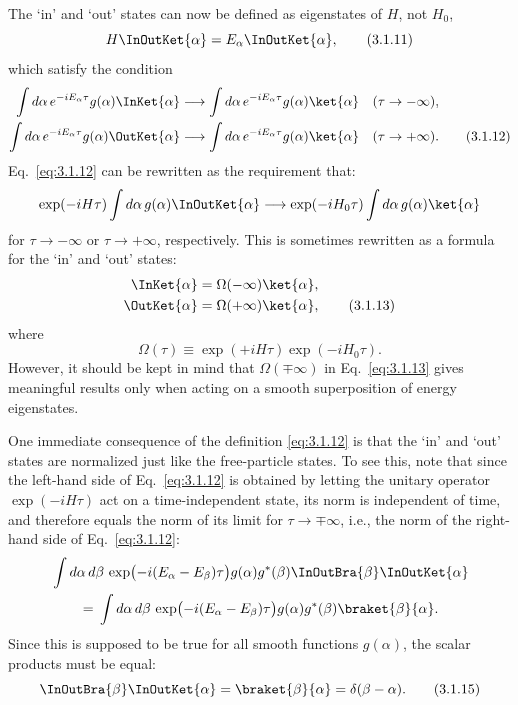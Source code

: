 The `in' and `out' states can now be defined as eigenstates of $H$, not $H_0$,
\begin{equation}
H\InOutKet{\alpha}
=E_\alpha\InOutKet{\alpha},
\tag{3.1.11}\label{eq:3.1.11}
\end{equation}
which satisfy the condition
\begin{align}
\int d\alpha\,e^{-iE_\alpha\tau}g(\alpha)
\InKet{\alpha}
&\longrightarrow
\int d\alpha\,e^{-iE_\alpha\tau}g(\alpha)\ket{\alpha}
&& (\tau\to-\infty),
\notag\\
\int d\alpha\,e^{-iE_\alpha\tau}g(\alpha)
\OutKet{\alpha}
&\longrightarrow
\int d\alpha\,e^{-iE_\alpha\tau}g(\alpha)\ket{\alpha}
&& (\tau\to+\infty).
\tag{3.1.12}\label{eq:3.1.12}
\end{align}
Eq.~\eqref{eq:3.1.12} can be rewritten as the requirement that:
\begin{align*}
\exp(-iH\tau)\int d\alpha\,g(\alpha)
\InOutKet{\alpha}
\longrightarrow
\exp(-iH_0\tau)\int d\alpha\,g(\alpha)\ket{\alpha}
\end{align*}
for $\tau\to-\infty$ or $\tau\to+\infty$, respectively. This is sometimes
rewritten as a formula for the `in' and `out' states:
\begin{align}
\InKet{\alpha}&=\Omega(-\infty)\ket{\alpha},
\notag\\
\OutKet{\alpha}&=\Omega(+\infty)\ket{\alpha},
\tag{3.1.13}\label{eq:3.1.13}
\end{align}
where
\begin{equation}
\Omega(\tau)\equiv\exp(+iH\tau)\exp(-iH_0\tau).
\tag{3.1.14}\label{eq:3.1.14}
\end{equation}
However, it should be kept in mind that $\Omega(\mp\infty)$ in
Eq.~\eqref{eq:3.1.13} gives meaningful results only when acting on a smooth
superposition of energy eigenstates.

One immediate consequence of the definition \eqref{eq:3.1.12} is that the `in' and
`out' states are normalized just like the free-particle states. To see this,
note that since the left-hand side of Eq.~\eqref{eq:3.1.12} is obtained by letting the
unitary operator $\exp(-iH\tau)$ act on a time-independent state, its norm is
independent of time, and therefore equals the norm of its limit for
$\tau\to\mp\infty$, i.e., the norm of the right-hand side of Eq.~\eqref{eq:3.1.12}:
\begin{align*}
&\int d\alpha\,d\beta\,
\exp\bigl(-i(E_\alpha-E_\beta)\tau\bigr)
g(\alpha)g^*(\beta)
\InOutBra{\beta}\InOutKet{\alpha}
\\
&\qquad={}
\int d\alpha\,d\beta\,
\exp\bigl(-i(E_\alpha-E_\beta)\tau\bigr)
g(\alpha)g^*(\beta)\braket{\beta}{\alpha}.
\end{align*}
Since this is supposed to be true for all smooth functions $g(\alpha)$, the
scalar products must be equal:
\begin{equation}
\InOutBra{\beta}\InOutKet{\alpha}
=\braket{\beta}{\alpha}=\delta(\beta-\alpha).
\tag{3.1.15}\label{eq:3.1.15}
\end{equation}

